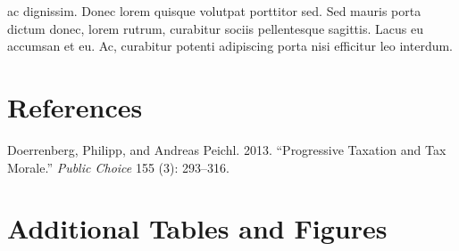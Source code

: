\documentclass[
  12pt,
]{article}
\newlength{\cslhangindent}
\newlength{\cslentryspacingunit} %
\newenvironment{CSLReferences}[2] %
 {%
  \setlength{\parindent}{0pt}
  \ifodd #1
  \let\oldpar\par
  \def\par{\hangindent=\cslhangindent\oldpar}
  \fi
  \setlength{\parskip}{#2\cslentryspacingunit}
 }%
 {}
\newcommand{\beginsupplement}{\setcounter{table}{0}  \renewcommand{\thetable}{A\arabic{table}}     \setcounter{figure}{0} \renewcommand{\thefigure}{A\arabic{figure}}}
\begin{document}
ac dignissim. Donec lorem quisque volutpat porttitor sed. Sed mauris porta dictum donec, lorem rutrum, curabitur sociis pellentesque sagittis. Lacus eu accumsan et eu. Ac, curabitur potenti adipiscing porta nisi efficitur leo interdum.

\hypertarget{references}{%
\section*{References}\label{references}}

\hypertarget{refs}{}
\begin{CSLReferences}{1}{0}
\leavevmode{}%
Doerrenberg, Philipp, and Andreas Peichl. 2013. {``Progressive Taxation and Tax Morale.''} \emph{Public Choice} 155 (3): 293--316.

\end{CSLReferences}

\clearpage

\hypertarget{appendix-appendix}{%
\appendix}


\beginsupplement

\hypertarget{additional-tables-and-figures}{%
\section{Additional Tables and Figures}\label{additional-tables-and-figures}}
\end{document}
